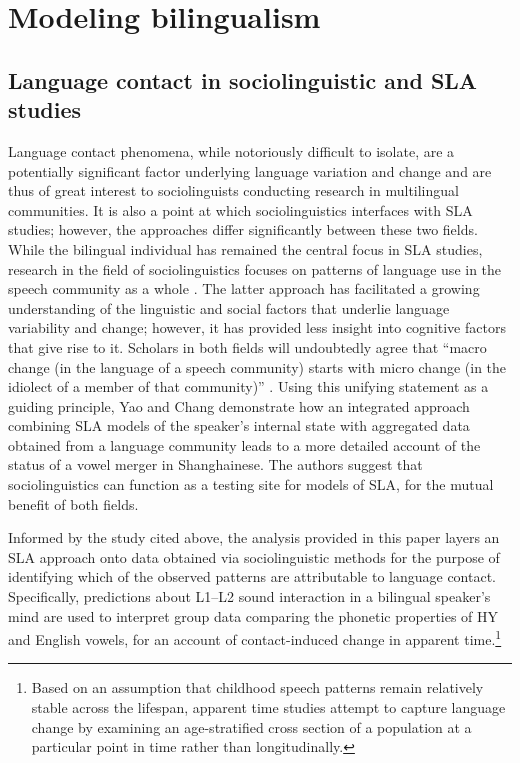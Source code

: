 \documentclass[output=paper]{langsci/langscibook}
\begin{document}
\section{Modeling bilingualism}
\label{sec:nove:3}

 
\subsection{Language contact in sociolinguistic and SLA studies} 
\label{sec:nove:3.1}


Language contact phenomena, while notoriously difficult to isolate, are a potentially significant factor underlying language variation and change and are thus of great interest to sociolinguists conducting research in multilingual communities. It is also a point at which sociolinguistics interfaces with SLA studies; however, the approaches differ significantly between these two fields. While the bilingual individual has remained the central focus in SLA studies, research in the field of sociolinguistics focuses on patterns of language use in the speech community as a whole \citep{Sankoff2002, YaoChang2016}. The latter approach has facilitated a growing understanding of the linguistic and social factors that underlie language variability and change; however, it has provided less insight into cognitive factors that give rise to it. Scholars in both fields will undoubtedly agree that “macro change (in the language of a speech community) starts with micro change (in the idiolect of a member of that community)” \citep[433]{YaoChang2016}. Using this unifying statement as a guiding principle, Yao and Chang demonstrate how an integrated approach combining SLA models of the speaker’s internal state with aggregated data obtained from a language community leads to a more detailed account of the status of a vowel merger in Shanghainese. The authors suggest that sociolinguistics can function as a testing site for models of SLA, for the mutual benefit of both fields.

Informed by the study cited above, the analysis provided in this paper layers an SLA approach onto data obtained via sociolinguistic methods for the purpose of identifying which of the observed patterns are attributable to language contact. Specifically, predictions about L1--L2 sound interaction in a bilingual speaker’s mind are used to interpret group data comparing the phonetic properties of HY and English vowels, for an account of contact-induced change in apparent time.\footnote{Based on an assumption that childhood speech patterns remain relatively stable across the lifespan, apparent time studies attempt to capture language change by examining an age-stratified cross section of a population at a particular point in time rather than longitudinally.} 
\end{document}
